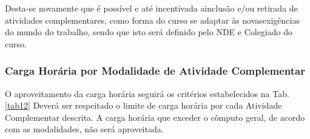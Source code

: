 \documentclass{paper}
\begin{document}
Desta-se novamente que é possível e até incentivada ainclusão e/ou retirada de atividades complementares, como forma do curso se adaptar às novasexigências do mundo do trabalho, sendo que isto será definido pelo NDE e Colegiado do curso.

\subsubsection{Carga Horária por Modalidade de Atividade Complementar}

O aproveitamento da carga horária seguirá os critérios estabelecidos na Tab. \ref{tab12} Deverá ser respeitado o limite de carga horária por cada Atividade Complementar descrita. A carga horária que exceder o cômputo geral, de acordo com as modalidades, não será aproveitada.
\end{document}
